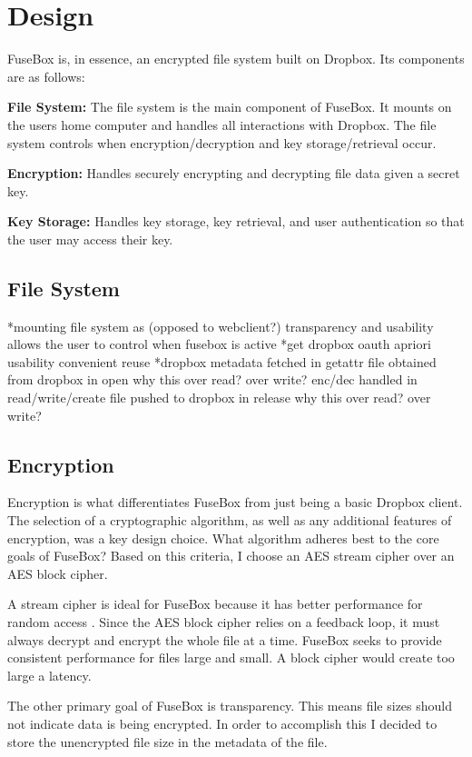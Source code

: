 \documentclass[11pt,twocolumn,letterpaper]{article}
\newcommand{\appname}{FuseBox }
\newcommand{\appnameWOspace}{FuseBox}
\begin{document}
\section{Design}
\label{sec:design}
\appname is, in essence, an encrypted file system built on
Dropbox. Its components are as follows:
\par {\bf File System:} The file system is the main component of 
\appnameWOspace. It mounts on the users home computer and handles 
all interactions with Dropbox. The file system controls when
encryption/decryption and key storage/retrieval occur.   
\par {\bf Encryption:} Handles securely encrypting and decrypting file data
given a secret key. 
\par {\bf Key Storage:} Handles key storage, key retrieval, and user
authentication so that the user may access their key. 

\subsection{File System}
\label{sec:fs}
*mounting file system as (opposed to webclient?)
   transparency and usability
   allows the user to control when fusebox is active
*get dropbox oauth apriori
   usability
   convenient reuse
*dropbox metadata
   fetched in getattr
   file obtained from dropbox in open
       why this over read? over write?
   enc/dec handled in read/write/create
   file pushed to dropbox in release
       why this over read? over write?


\subsection{Encryption}
\label{sec:enc}
Encryption is what differentiates \appname from just being a basic
Dropbox client. The selection of a cryptographic algorithm, as well as
any additional features of encryption, was a key design choice. What
algorithm adheres best to the core goals of \appnameWOspace? Based on
this criteria, I choose an AES stream cipher over an AES block cipher. 
\par A stream cipher is ideal for \appname because it has better
performance for random access \cite{exampleref1}. Since the AES block 
cipher relies on a feedback loop, it must always decrypt and encrypt
the whole file at a time. \appname seeks to provide consistent
performance for files large and small. A block cipher would create
too large a latency.   
\par The other primary goal of \appname is transparency. This means
file sizes should not indicate data is being encrypted. In order to
accomplish this I decided to store the unencrypted file size in the
metadata of the file. 
\end{document}
